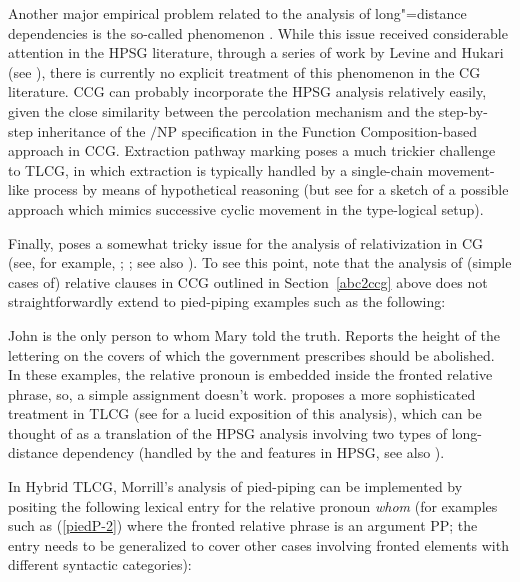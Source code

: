 \documentclass[output=paper
                ,modfonts
 	        ,biblatex
                ,babelshorthands
                ,newtxmath
                ,draftmode
                ,colorlinks, citecolor=brown
]{langscibook}
\begin{document}
Another major empirical problem related to the analysis of
long"=distance dependencies is the so-called  phenomenon \citep{mccloskey79,Zaenen83a-u}. While this issue
received considerable attention in the HPSG literature, through a
series of work by Levine and Hukari (see \citealt{LH2006a}), there is
currently no explicit treatment of this phenomenon in the CG
literature. CCG can probably incorporate the HPSG analysis relatively
easily, given the close similarity between the \slasch percolation
mechanism and the step-by-step inheritance of the $/$NP specification
in the Function Composition-based approach in CCG. Extraction pathway
marking poses a much trickier challenge to TLCG, in which extraction
is typically handled by a single-chain movement-like process by means
of hypothetical reasoning (but see \citealt[Chapter 7]{KubotaLevineBook}
for a sketch of a possible approach which mimics successive cyclic
movement in the type-logical setup).

Finally,\label{cg:page-pied-piping-start}  poses a somewhat tricky issue for the
analysis of relativization in CG (see, for example,
\citealt{Pollard88a,Morrill94a-u};
\citealt[Section~8.6]{MuellerGT-Eng3}; see also
). To see this point,
note that the analysis of (simple cases of) relative clauses in CCG
outlined in Section~\ref{abc2ccg} above does not straightforwardly
extend to pied-piping examples such as the following:

\eal
\label{piedP}
\ex\label{piedP-2}
    John is the only person to whom Mary told the truth.
\ex\label{piedP-1}
    Reports the height of the lettering on the covers of which the
    government prescribes should be abolished. \mbox{}\hfill{\mbox{\citep[109]{Ross67a}}}
\zl
In these examples, the relative pronoun is embedded inside
the fronted relative phrase, so, a simple 
assignment doesn't work.
\citet[Chapter~4, Section~3.3]{Morrill94a-u} proposes 
a more sophisticated treatment in TLCG (see \citealt[Section~9.7]{Carpenter98a-u}
for a lucid exposition of this analysis), which can be thought of as
a translation of the HPSG analysis \citep[Chapter~5]{ps2} involving two types
of long-distance dependency (handled by the
\REL and \SLASH features
in HPSG, see also ).

In Hybrid TLCG, Morrill's analysis of pied-piping
can be implemented by positing the following lexical entry for the
relative pronoun \textit{whom} (for examples such as (\ref{piedP-2}) where 
the fronted relative
phrase is an argument PP; the entry needs to be generalized to cover
other cases involving fronted elements with different syntactic categories): 
\end{document}
